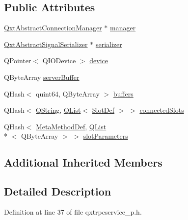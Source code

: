 \subsection*{Public Attributes}
\begin{DoxyCompactItemize}
\item 
\hyperlink{class_qxt_abstract_connection_manager}{Qxt\-Abstract\-Connection\-Manager} $\ast$ \hyperlink{class_qxt_r_p_c_service_private_ae3513032256567da4708ca2981987a41}{manager}
\item 
\hyperlink{class_qxt_abstract_signal_serializer}{Qxt\-Abstract\-Signal\-Serializer} $\ast$ \hyperlink{class_qxt_r_p_c_service_private_a652c122f7e12c306da57ee6d20ca773e}{serializer}
\item 
Q\-Pointer$<$ Q\-I\-O\-Device $>$ \hyperlink{class_qxt_r_p_c_service_private_abe02c173d354dc63ee59e7065698ab06}{device}
\item 
Q\-Byte\-Array \hyperlink{class_qxt_r_p_c_service_private_aa4745c217565ea25afa843e6d2393f38}{server\-Buffer}
\item 
Q\-Hash$<$ quint64, Q\-Byte\-Array $>$ \hyperlink{class_qxt_r_p_c_service_private_a7af730deef31fb1e97e08b632c45197a}{buffers}
\item 
Q\-Hash$<$ \hyperlink{group___u_a_v_objects_plugin_gab9d252f49c333c94a72f97ce3105a32d}{Q\-String}, \hyperlink{class_q_list}{Q\-List}$<$ \hyperlink{struct_qxt_r_p_c_service_private_1_1_slot_def}{Slot\-Def} $>$ $>$ \hyperlink{class_qxt_r_p_c_service_private_a6161c6c107d01186e3b25282fa4b9bf6}{connected\-Slots}
\item 
Q\-Hash$<$ \hyperlink{class_qxt_r_p_c_service_private_a307b87cfecad046cb6bc59a6141251ac}{Meta\-Method\-Def}, \hyperlink{class_q_list}{Q\-List}\\*
$<$ Q\-Byte\-Array $>$ $>$ \hyperlink{class_qxt_r_p_c_service_private_acea466106d8c44ec5377d203d0fb4a5d}{slot\-Parameters}
\end{DoxyCompactItemize}
\subsection*{Additional Inherited Members}


\subsection{Detailed Description}


Definition at line 37 of file qxtrpcservice\-\_\-p.\-h.



